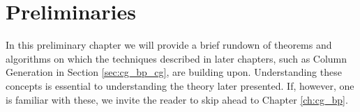 \chapter{Preliminaries}\label{ch:preliminaries}

In this preliminary chapter we will provide a brief rundown of theorems and algorithms on which the techniques described in later chapters, such as Column Generation in Section \ref{sec:cg_bp_cg}, are building upon. Understanding these concepts is essential to understanding the theory later presented. If, however, one is familiar with these, we invite the reader to skip ahead to Chapter \ref{ch:cg_bp}.



